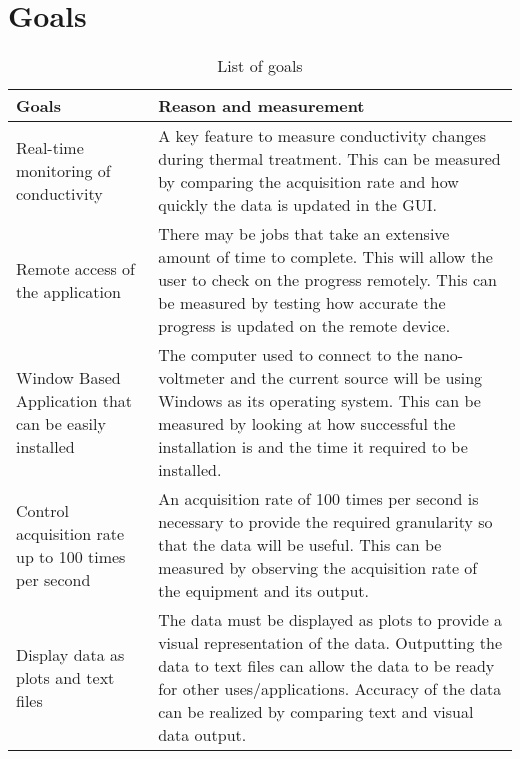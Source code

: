 \documentclass[12pt, titlepage]{article}
\begin{document}
\section{Goals}
\begin{table}[h!]
    \centering
    \begin{tabular}{p{} p{}}
    
    \toprule
    \textbf{Goals} & \textbf{Reason and measurement}\\
   
    \midrule{Real-time monitoring of conductivity} & A key feature to measure conductivity changes during thermal treatment. This can be measured by comparing the acquisition rate and how quickly the data is updated in the GUI. \\
    \midrule{Remote access of the application} & There may be jobs that take an extensive amount of time to complete. This will allow the user to check on the progress remotely. This can be measured by testing how accurate the progress is updated on the remote device. \\
    \midrule{Window Based Application that can be easily installed} & The computer used to connect to the nano-voltmeter and the current source will be using Windows as its operating system. This can be measured by looking at how successful the installation is and the time it required to be installed. \\
    \midrule{Control acquisition rate up to 100 times per second} & An acquisition rate of 100 times per second is necessary to provide the required granularity so that the data will be useful. This can be measured by observing the acquisition rate of the equipment and its output. \\
    \midrule{Display data as plots and text files} & The data must be displayed as plots to provide a visual representation of the data. Outputting the data to text files can allow the data to be ready for other uses/applications. Accuracy of the data can be realized by comparing text and visual data output. \\
    
    \bottomrule
    
    \end{tabular}
    \caption{List of goals}
\end{table}


\newpage
\end{document}
